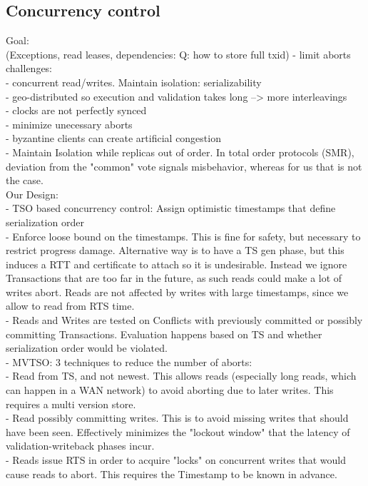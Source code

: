 \subsection{Concurrency control}
Goal: \\(Exceptions, read leases, dependencies: Q: how to store full txid)
- limit aborts\\

challenges:\\
- concurrent read/writes. Maintain isolation: serializability\\
- geo-distributed so execution and validation takes long --> more interleavings\\
- clocks are not perfectly synced\\
- minimize unecessary aborts\\
- byzantine clients can create artificial congestion\\

- Maintain Isolation while replicas out of order. In total order protocols (SMR), deviation from the "common" vote signals misbehavior, whereas for us that is not the case. \\

Our Design:\\
- TSO based concurrency control: Assign optimistic timestamps that define serialization order\\
- Enforce loose bound on the timestamps. This is fine for safety, but necessary to restrict progress damage. Alternative way is to have a TS gen phase, but this induces a RTT and certificate to attach so it is undesirable. Instead we ignore Transactions that are too far in the future, as such reads could make a lot of writes abort. Reads are not affected by writes with large timestamps, since we allow to read from RTS time.\\
- Reads and Writes are tested on Conflicts with previously committed or possibly committing Transactions. Evaluation happens based on TS and whether serialization order would be violated.\\
- MVTSO: 3 techniques to reduce the number of aborts:\\
	- Read from TS, and not newest. This allows reads (especially long reads, which can happen in a WAN network) to avoid aborting due to later writes. This requires a multi version store.\\
	- Read possibly committing writes. This is to avoid missing writes that should have been seen. Effectively minimizes the "lockout window" that the latency of validation-writeback phases incur.\\
	- Reads issue RTS in order to acquire "locks" on concurrent writes that would cause reads to abort. This requires the Timestamp to be known in advance. \\
	
